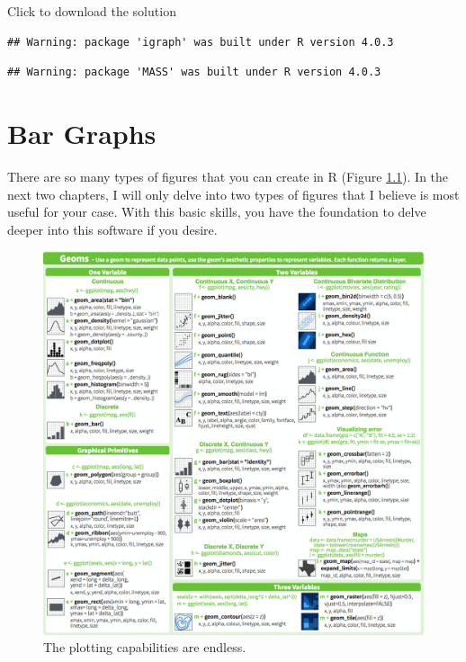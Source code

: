 \documentclass[
]{book}
\begin{document}
Click to download the solution

\begin{verbatim}
## Warning: package 'igraph' was built under R version 4.0.3
\end{verbatim}

\begin{verbatim}
## Warning: package 'MASS' was built under R version 4.0.3
\end{verbatim}

\hypertarget{CHAPTER-BAR-GRAPH}{%
\chapter{Bar Graphs}\label{CHAPTER-BAR-GRAPH}}

There are so many types of figures that you can create in R (Figure \ref{fig:FIG-RICH-GRAPH}). In the next two chapters, I will only delve into two types of figures that I believe is most useful for your case. With this basic skills, you have the foundation to delve deeper into this software if you desire.

\begin{figure}

{\centering \includegraphics[width=22.25in]{images/chapter-6/ggplot2_geoms} 

}

\caption[The plotting capabilities are endless]{The plotting capabilities are endless.}\label{fig:FIG-RICH-GRAPH}
\end{figure}
\end{document}
